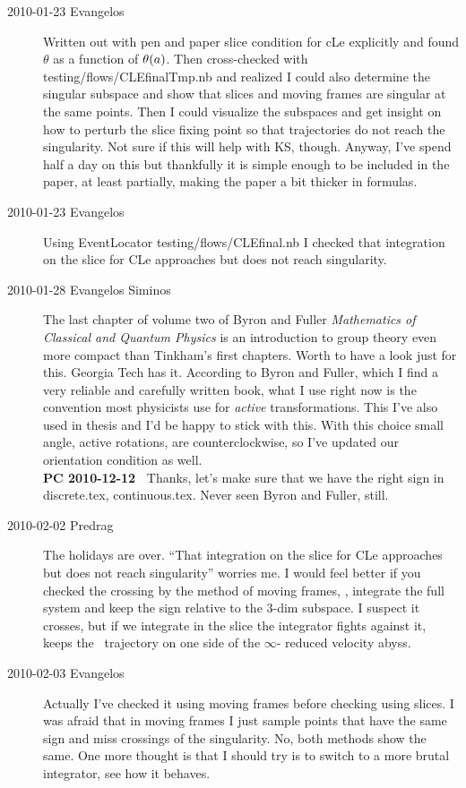 \begin{description}
\item[2010-01-23 Evangelos]
Written out with pen and paper slice condition for cLe
explicitly and found $\theta$ as a function of
$\theta(a)$. Then cross-checked with
testing/flows/CLEfinalTmp.nb and realized I could also
determine the singular subspace and show that slices and
moving frames are singular at the same points. Then I could
visualize the subspaces and get insight on how to perturb the
slice fixing point so that trajectories do not reach the
singularity. Not sure if this will help with KS, though.
Anyway, I've spend half a day on this but thankfully it is
simple enough to be included in the paper, at least
partially, making the paper a bit thicker in formulas.


\item[2010-01-23 Evangelos]
Using EventLocator testing/flows/CLEfinal.nb I checked that
integration on the slice for CLe approaches but does not
reach singularity.

\item[2010-01-28 Evangelos Siminos]
The last chapter of volume two of Byron and Fuller
{\em Mathematics of Classical and Quantum
Physics}
is an introduction to
group theory even more compact than Tinkham's first chapters. Worth to
have a look just for this. Georgia Tech has it.
According
to Byron and Fuller, which I find a very reliable and carefully written
book, what I use right now is the convention most physicists
use for \emph{active} transformations. This I've also used
in thesis and I'd be happy to stick with this. With this choice
small angle, active rotations, are counterclockwise, so I've updated
our orientation condition as well.
\\
{\bf PC 2010-12-12~} Thanks, let's make sure that we have the
right sign in discrete.tex, continuous.tex.
Never seen Byron and Fuller, still.

\item[2010-02-02 Predrag]
The holidays are over. ``That integration on the slice for
CLe approaches but does not reach singularity'' worries me. I
would feel better if you checked the crossing by the method
of moving frames, \ie, integrate the full system and keep the
sign relative to the 3-dim subspace. I suspect it crosses,
but if we integrate in the slice the integrator fights against it,
keeps the \reducedsp\ trajectory on one side of the $\infty$- reduced
velocity abyss.

\item[2010-02-03 Evangelos]
Actually I've checked it using moving frames before checking using slices.
I was afraid that in moving frames I just sample points that have the same
sign and miss crossings of the singularity. No, both methods show the same.
One more thought is that I should try is to switch to a more brutal integrator,
see how it behaves.


\end{description}
